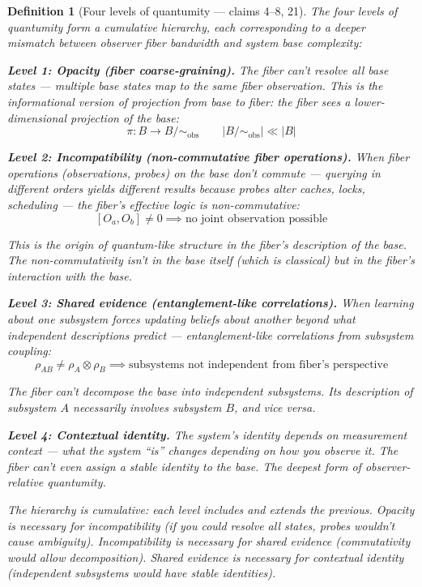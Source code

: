 \documentclass[11pt,a4paper]{article}
\newtheorem{definition}{Definition}[section]
\begin{document}
\begin{definition}[Four levels of quantumity --- claims 4--8, 21]
\label{def:levels}
The four levels of quantumity form a cumulative hierarchy, each
corresponding to a deeper mismatch between observer fiber bandwidth
and system base complexity:

\textbf{Level 1: Opacity (fiber coarse-graining).}
The fiber can't resolve all base states --- multiple base states map to
the same fiber observation. This is the informational version of
projection from base to fiber: the fiber sees a lower-dimensional
projection of the base:
\[
  \pi: B \to B/{\sim_{\text{obs}}} \qquad
  |B/{\sim_{\text{obs}}}| \ll |B|
\]

\textbf{Level 2: Incompatibility (non-commutative fiber operations).}
When fiber operations (observations, probes) on the base don't commute
--- querying in different orders yields different results because probes
alter caches, locks, scheduling --- the fiber's effective logic is
non-commutative:
\[
  [O_a, O_b] \neq 0 \implies \text{no joint observation possible}
\]

This is the origin of quantum-like structure in the fiber's description
of the base. The non-commutativity isn't in the base itself (which is
classical) but in the fiber's interaction with the base.

\textbf{Level 3: Shared evidence (entanglement-like correlations).}
When learning about one subsystem forces updating beliefs about another
beyond what independent descriptions predict --- entanglement-like
correlations from subsystem coupling:
\[
  \rho_{AB} \neq \rho_A \otimes \rho_B \implies
  \text{subsystems not independent from fiber's perspective}
\]

The fiber can't decompose the base into independent subsystems. Its
description of subsystem $A$ necessarily involves subsystem $B$, and
vice versa.

\textbf{Level 4: Contextual identity.}
The system's identity depends on measurement context --- what the system
``is'' changes depending on how you observe it. The fiber can't even
assign a stable identity to the base. The deepest form of observer-relative
quantumity.

The hierarchy is cumulative: each level includes and extends the previous.
Opacity is necessary for incompatibility (if you could resolve all states,
probes wouldn't cause ambiguity). Incompatibility is necessary for shared
evidence (commutativity would allow decomposition). Shared evidence is
necessary for contextual identity (independent subsystems would have
stable identities).
\end{definition}
\end{document}
